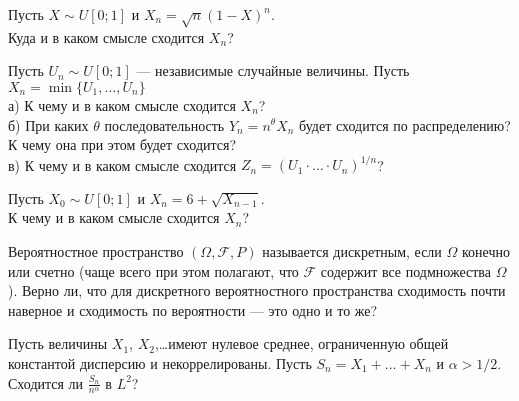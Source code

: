 \begin{problem}
Пусть $X\sim U[0;1]$ и $X_{n}=\sqrt{n}(1-X)^{n}$. \\
Куда и в каком смысле сходится $X_{n}$?

\begin{sol}

\end{sol}
\end{problem}

\begin{problem}
Пусть $U_{n}\sim U[0;1]$ — независимые случайные величины. Пусть
$X_{n}=\min\{U_{1},\ldots,U_{n}\}$ \\
а) К чему и в каком смысле сходится $X_{n}$? \\
б) При каких $\theta$ последовательность $Y_{n}=n^{\theta}X_{n}$
будет сходится по распределению? К чему она при этом будет
сходится? \\
в) К чему и в каком смысле сходится $Z_{n}=(U_{1}\cdot\ldots\cdot U_{n})^{1/n}$?

\begin{sol}

\end{sol}
\end{problem}

\begin{problem}
Пусть $X_{0}\sim U[0;1]$ и $X_{n}=6+\sqrt{X_{n-1}}$. \\
К чему и в каком смысле сходится $X_{n}$?

\begin{sol}

\end{sol}
\end{problem}

\begin{problem}
Вероятностное пространство $(\Omega,\mathcal{F},P)$ называется
дискретным, если $\Omega$ конечно или счетно (чаще всего при этом
полагают, что $\mathcal{F}$ содержит все подмножества $\Omega$).
Верно ли, что для дискретного вероятностного пространства
сходимость почти наверное и сходимость по вероятности — это одно и
то же?

\begin{sol}

\end{sol}
\end{problem}

\begin{problem}
Пусть величины $X_{1}$, $X_{2}$,\ldots имеют нулевое среднее, ограниченную общей константой дисперсию и некоррелированы. Пусть $S_{n}=X_{1}+\ldots+X_{n}$ и $\alpha>1/2$.\\
Сходится ли $\frac{S_{n}}{n^{\alpha}}$ в $L^{2}$?

\begin{sol}

\end{sol}
\end{problem}

